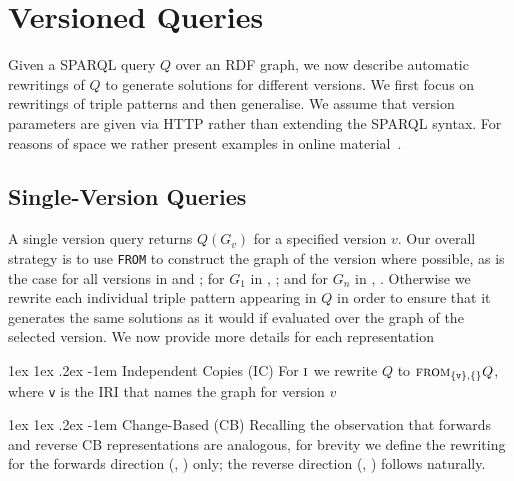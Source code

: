 \documentclass[a4paper]{llncs}
\makeatletter
\renewcommand\paragraph{\@startsection{paragraph}{4}{\z@}%
	{1ex \@plus1ex \@minus.2ex}%
	{-1em}%
	{\normalfont\normalsize\itshape}}
\newcommand{\sfrom}[3]{\ensuremath{\textsc{from}_{#2,#3}#1}}
\makeatother
\begin{document}


\section{Versioned Queries}

Given a SPARQL query $Q$ over an RDF graph, we now describe automatic rewritings of $Q$ to generate solutions for different versions. We first focus on rewritings of triple patterns and then generalise. We assume that version parameters are given via HTTP rather than extending the SPARQL syntax. For reasons of space we rather present examples in online material~\cite{online}.

\subsection{Single-Version Queries} A single version query returns $Q(G_v)$ for a specified version $v$. Our overall strategy is to use \texttt{FROM} to construct the graph of the version where possible, as is the case for all versions in \ic and \tb; for $G_1$ in \cbpd, \cbpi; and for $G_n$ in \cbmd, \cbmi. Otherwise we rewrite each individual triple pattern appearing in $Q$ in order to ensure that it generates the same solutions as it would if evaluated over the graph of the selected version. We now provide more details for each representation

\paragraph{Independent Copies (IC)} For $\textsc{i}$ we rewrite $Q$ to \sfrom{Q}{\{\texttt{v}\}}{\{\}}, where \texttt{v} is the IRI that names the graph for version $v$

\paragraph{Change-Based (CB)} Recalling the observation that forwards and reverse CB representations are analogous, for brevity we define the rewriting for the forwards direction (\cbpd, \cbpi) only; the reverse direction (\cbmd, \cbmi) follows naturally. 
\end{document}
